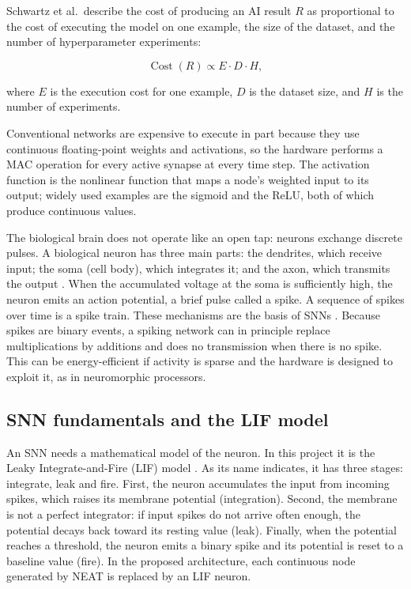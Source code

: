 Schwartz et al.\ describe the cost of producing an AI result $R$ as proportional to the cost of executing the model on one example, the size of the dataset, and the number of hyperparameter experiments:

\begin{equation}
    \operatorname{Cost}(R) \propto E \cdot D \cdot H,
\end{equation}

where $E$ is the execution cost for one example, $D$ is the dataset size, and $H$ is the number of experiments.

Conventional networks are expensive to execute in part because they use continuous floating-point weights and activations, so the hardware performs a MAC operation for every active synapse at every time step. The activation function is the nonlinear function that maps a node's weighted input to its output; widely used examples are the sigmoid and the ReLU, both of which produce continuous values.

The biological brain does not operate like an open tap: neurons exchange discrete pulses. A biological neuron has three main parts: the dendrites, which receive input; the soma (cell body), which integrates it; and the axon, which transmits the output \cite{gerstner2014}. When the accumulated voltage at the soma is sufficiently high, the neuron emits an action potential, a brief pulse called a spike. A sequence of spikes over time is a spike train. These mechanisms are the basis of SNNs \cite{gerstner2014}. Because spikes are binary events, a spiking network can in principle replace multiplications by additions and does no transmission when there is no spike. This can be energy-efficient if activity is sparse and the hardware is designed to exploit it, as in neuromorphic processors.

\subsection{SNN fundamentals and the LIF model}

An SNN needs a mathematical model of the neuron. In this project it is the Leaky Integrate-and-Fire (LIF) model \cite{gerstner2014}. As its name indicates, it has three stages: integrate, leak and fire. First, the neuron accumulates the input from incoming spikes, which raises its membrane potential (integration). Second, the membrane is not a perfect integrator: if input spikes do not arrive often enough, the potential decays back toward its resting value (leak). Finally, when the potential reaches a threshold, the neuron emits a binary spike and its potential is reset to a baseline value (fire). In the proposed architecture, each continuous node generated by NEAT is replaced by an LIF neuron.

